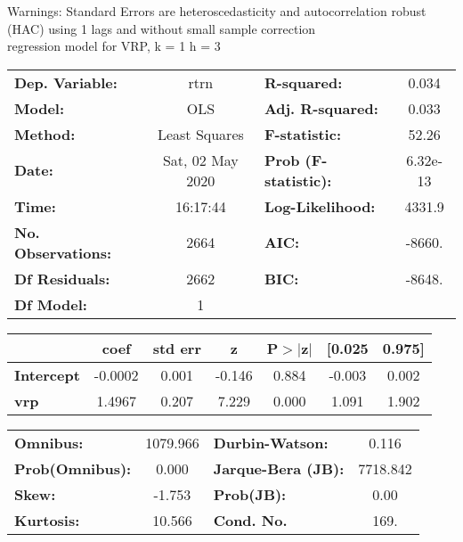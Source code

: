Warnings: \newline
 [1] Standard Errors are heteroscedasticity and autocorrelation robust (HAC) using 1 lags and without small sample correction\\ 

regression model for VRP, k = 1 h = 3\begin{center}
\begin{tabular}{lclc}
\toprule
\textbf{Dep. Variable:}    &       rtrn       & \textbf{  R-squared:         } &     0.034   \\
\textbf{Model:}            &       OLS        & \textbf{  Adj. R-squared:    } &     0.033   \\
\textbf{Method:}           &  Least Squares   & \textbf{  F-statistic:       } &     52.26   \\
\textbf{Date:}             & Sat, 02 May 2020 & \textbf{  Prob (F-statistic):} &  6.32e-13   \\
\textbf{Time:}             &     16:17:44     & \textbf{  Log-Likelihood:    } &    4331.9   \\
\textbf{No. Observations:} &        2664      & \textbf{  AIC:               } &    -8660.   \\
\textbf{Df Residuals:}     &        2662      & \textbf{  BIC:               } &    -8648.   \\
\textbf{Df Model:}         &           1      & \textbf{                     } &             \\
\bottomrule
\end{tabular}
\begin{tabular}{lcccccc}
                   & \textbf{coef} & \textbf{std err} & \textbf{z} & \textbf{P$> |$z$|$} & \textbf{[0.025} & \textbf{0.975]}  \\
\midrule
\textbf{Intercept} &      -0.0002  &        0.001     &    -0.146  &         0.884        &       -0.003    &        0.002     \\
\textbf{vrp}       &       1.4967  &        0.207     &     7.229  &         0.000        &        1.091    &        1.902     \\
\bottomrule
\end{tabular}
\begin{tabular}{lclc}
\textbf{Omnibus:}       & 1079.966 & \textbf{  Durbin-Watson:     } &    0.116  \\
\textbf{Prob(Omnibus):} &   0.000  & \textbf{  Jarque-Bera (JB):  } & 7718.842  \\
\textbf{Skew:}          &  -1.753  & \textbf{  Prob(JB):          } &     0.00  \\
\textbf{Kurtosis:}      &  10.566  & \textbf{  Cond. No.          } &     169.  \\
\bottomrule
\end{tabular}
\end{center}

